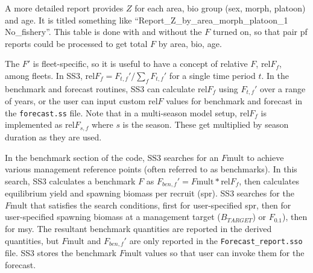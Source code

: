 A more detailed report provides $Z$ for each area, bio group (sex, morph, platoon) and age. It is titled something like ``Report\_Z\_by\_area\_morph\_platoon\_1 No\_fishery''. This table is done with and without the $F$ turned on, so that pair pf reports could be processed to get total $F$ by area, bio, age.

The $F'$ is fleet-specific, so it is useful to have a concept of relative $F$, $\text{rel}F_f$, among fleets. In SS3, $\text{rel}F_f= F_{t,f}'/\sum_{f}^{}F_{t,f}'$ for a single time period $t$. In the benchmark and forecast routines, SS3 can calculate $\text{rel}F_f$ using $F_{t,f}'$ over a range of years, or the user can input custom $\text{rel}F$ values for benchmark and forecast in the \texttt{forecast.ss} file. Note that in a multi-season model setup, $\text{rel}F_f$ is implemented as $\text{rel}F_{s,f}$ where $s$ is the season. These get multiplied by season duration as they are used.

In the benchmark section of the code, SS3 searches for an $F\text{mult}$ to achieve various management reference points (often referred to as benchmarks). In this search, SS3 calculates a benchmark $F$ as $F_{ben,f}' = F\text{mult} * \text{rel}F_f$, then calculates equilibrium yield and spawning biomass per recruit (\gls{spr}). SS3 searches for the $F\text{mult}$ that satisfies the search conditions, first for user-specified \gls{spr}, then for user-specified spawning biomass at a management target ($B_{TARGET}$) or $F_{0.1}$), then for \gls{msy}. The resultant benchmark quantities are reported in the derived quantities, but $F\text{mult}$ and $F_{ben,f}'$ are only reported in the \texttt{Forecast\_report.sso} file. SS3 stores the benchmark $F\text{mult}$ values so that user can invoke them for the forecast.

